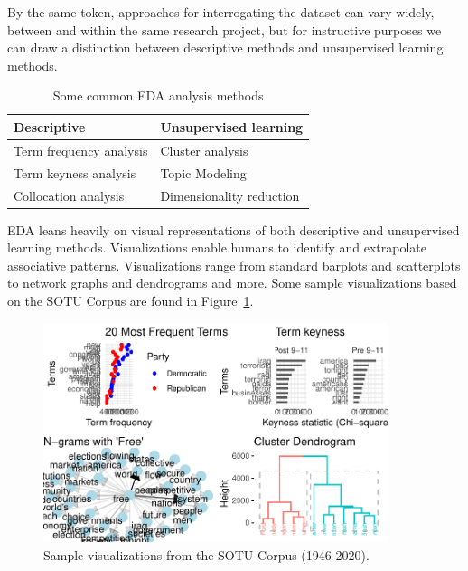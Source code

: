 \documentclass[
  letterpaper,
]{latex/krantz}
\begin{document}
By the same token, approaches for interrogating the dataset can vary
widely, between and within the same research project, but for
instructive purposes we can draw a distinction between descriptive
methods and unsupervised learning methods.

\hypertarget{tbl-eda-approaches-table}{}
\begin{table}
\caption{\label{tbl-eda-approaches-table}Some common EDA analysis methods }\tabularnewline

\centering
\begin{tabular}{ll}
\toprule
Descriptive & Unsupervised learning\\
\midrule
Term frequency analysis & Cluster analysis\\
Term keyness analysis & Topic Modeling\\
Collocation analysis & Dimensionality reduction\\
\bottomrule
\end{tabular}
\end{table}

EDA leans heavily on visual representations of both descriptive and
unsupervised learning methods. Visualizations enable humans to identify
and extrapolate associative patterns. Visualizations range from standard
barplots and scatterplots to network graphs and dendrograms and more.
Some sample visualizations based on the SOTU Corpus are found in
Figure~\ref{fig-eda-visualizations-grid}.

\begin{figure}[h]

{\centering \includegraphics[width=0.9\textwidth,height=\textheight]{./approaching-analysis_files/figure-pdf/fig-eda-visualizations-grid-1.pdf}

}

\caption{\label{fig-eda-visualizations-grid}Sample visualizations from
the SOTU Corpus (1946-2020).}

\end{figure}
\end{document}
